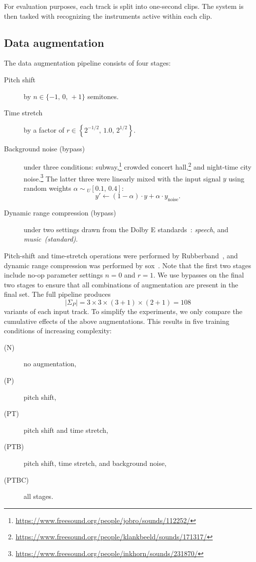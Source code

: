 \documentclass{article}
\begin{document}
For evaluation purposes, each track is split into one-second clips.
The system is then tasked with recognizing the instruments active within each clip.

\subsection{Data augmentation}

The data augmentation pipeline consists of four stages:

\begin{description}
    \item[Pitch shift] by $n \in \{-1,\, 0,\, +1\}$ semitones.
    \item[Time stretch] by a factor of $r \in \left\{ 2^{-1/2},\, 1.0,\, 2^{1/2}\right\}$.
    \item[Background noise (bypass)] under three conditions:
        subway,\footnote{\url{https://www.freesound.org/people/jobro/sounds/112252/}}
        crowded concert hall,\footnote{\url{https://www.freesound.org/people/klankbeeld/sounds/171317/}}
        and night-time city noise.\footnote{\url{https://www.freesound.org/people/inkhorn/sounds/231870/}}
        The latter three were linearly mixed with the input signal $y$ using random weights
        $\alpha \sim { }_U[0.1,\, 0.4]$:
        \[
            y' \leftarrow (1-\alpha) \cdot y + \alpha \cdot y_\text{noise}.
        \]
    \item[Dynamic range compression (bypass)] under two settings drawn from the {Dolby E}
        standards~\cite{dolbyE}: \emph{speech},
        and \emph{music~(standard)}.
\end{description}

Pitch-shift and time-stretch operations were performed by Rubberband~\cite{rubberband}, and dynamic range
compression was performed by sox~\cite{sox}.
Note that the first two stages include no-op parameter settings $n=0$ and $r=1$.  We use
bypasses on the final two stages to ensure that all combinations of augmentation are
present in the final set.
The full pipeline produces
\[
|\Sigma_P| = 3\times 3\times (3+1)\times (2+1) = 108\]
variants of each input track.  To simplify the experiments, we only compare the cumulative effects of the above
augmentations.  This results in five training conditions of increasing complexity:
\begin{description}
    \item[(N)] no augmentation,
        \vspace{-.5\baselineskip}
    \item[(P)] pitch shift,
        \vspace{-.5\baselineskip}
    \item[(PT)] pitch shift and time stretch,
        \vspace{-.5\baselineskip}
    \item[(PTB)] pitch shift, time stretch, and background noise,
        \vspace{-.5\baselineskip}
    \item[(PTBC)] all stages.
\end{description}
\end{document}
